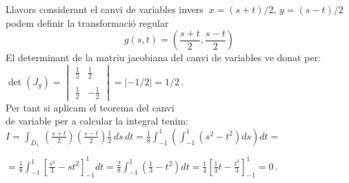 \documentclass[12pt]{article}
\begin{document}
\vspace*{1cm}

Llavors considerant el canvi de variables invers $\ x=(s+t)/2,\,
y=(s-t)/2\ $ podem definir la transformaci{\'o} regular $$
g(s,t)=\left(\frac{s+t}{2}, \frac{s-t}{2}\right)
$$ 
El determinant de la matriu jacobiana
del canvi de variables ve donat per:\\

\hspace*{1cm} $\det(J_g)=
\begin{vmatrix}
\frac{1}{2} & \frac{1}{2}\\
\\
\frac{1}{2} & -\frac{1}{2}
\end{vmatrix}=|-1/2|=1/2\,.$ \\

Per tant si aplicam el teorema del
canvi\\

 de variable per a calcular la integral tenim:\\

\hspace*{1cm} $I=\displaystyle\int_{D_1}\,
\left(\frac{s+t}{2}\right)\left(\frac{s-t}{2}\right)\frac{1}{2}\,ds\,dt=
\frac{1}{8}\int_{-1}^1\left(\int_{-1}^1(s^2-t^2)ds\right)dt=$


\vspace{0.9cm}
\hspace*{1cm}
$=\displaystyle\frac{1}{8}\int_{-1}^1\left[\frac{s^3}{3}- s
t^2\right]_{-1}^1dt= \frac{2}{8}\int_{-1}^1(\frac{1}{3}-  t^2)dt=
\frac{1}{4}\left[\frac{1}{3}t-\frac{t^3}{3}\right]_{-1}^1=0\,.$
\end{document}
